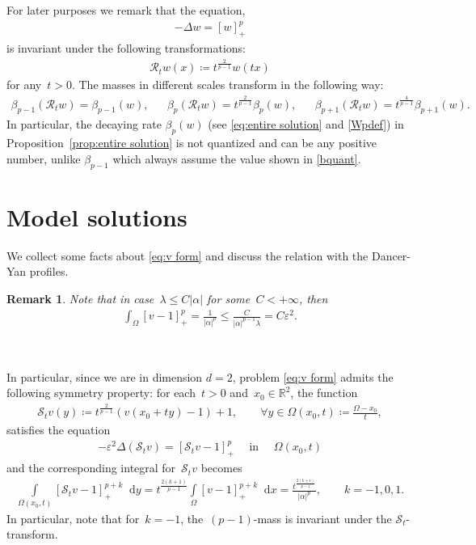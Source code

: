 \documentclass[10pt]{amsart}
\newcommand{\parenthesis}[1]{\left(#1\right)} %
\newcommand{\R}{\mathbb{R}}
\newcommand{\dd}{\mathop{}\!\mathrm{d}}
\def\R{\mathbb{R}}
\newtheorem{remark}[theorem]{Remark}
\begin{document}
For later purposes we remark that the equation,
    \begin{align}\label{rinv1}
        -\Delta  w= [w]_+^p
    \end{align}
    is invariant under the following transformations:
    \begin{align}\label{rinv2}
        {\mathcal{R}}_t w(x) \coloneq t^{\frac{2}{p-1}}w(tx)
    \end{align}
    for any~$t >0$.
    The masses in different scales transform in the following way:
    \begin{align}\label{rinv3}
       \beta_{p-1}({\mathcal{R}}_t w) =\beta_{p-1}(w), & &
        \beta_p ({\mathcal{R}}_t w) = t^{\frac{2}{p-1}} \beta_{p}(w), & &
        \beta_{p+1} ({\mathcal{R}}_t w) = t^{\frac{4}{p-1}} \beta_{p+1}(w).
    \end{align}
    In particular, the decaying rate $\beta_p(w)$ (see \eqref{eq:entire solution} and \eqref{Wpdef}) in Proposition~\ref{prop:entire solution} is
    not quantized and can be any positive number, unlike $\beta_{p-1}$ which always assume the value shown in \eqref{bquant}.

\bigskip


\section{Model solutions}\label{sec3}
We collect some facts about \eqref{eq:v form} and discuss the relation with the Dancer-Yan profiles.

\begin{remark}
    Note that in case~$\lambda\leq C|\alpha|$ for some~$C<+\infty$, then
    \begin{align*}
        \int_{\Omega} [v-1]_+^p=\frac{1}{|\alpha|^p}\leq \frac{C}{|\alpha|^{p-1}\lambda}=C\varepsilon^2.
    \end{align*}
\end{remark}

\

In particular, since we are in dimension $d=2$, problem \eqref{eq:v form} admits the following symmetry property: for each~$t>0$ and~$x_0\in\R^2$, the function
\begin{align*}
    \mathcal{S}_t v(y)\coloneqq t^{\frac{2}{p-1}} \parenthesis{ v(x_0+ ty) -1 }+1, \qquad \forall y\in \Omega(x_0,t)\coloneqq \frac{\Omega -x_0}{t},
\end{align*}
satisfies the equation
\begin{align*}
        -\varepsilon^2\Delta \parenthesis{\mathcal{S}_t v} = [\mathcal{S}_t v -1]_+^p \quad \mbox{ in }\quad  \Omega(x_0,t)
\end{align*}
and the corresponding integral for~$\mathcal{S}_t v$ becomes
\begin{align*}
    \int\limits_{\Omega(x_0,t)} [\mathcal{S}_t v -1]_+^{p+k} \dd y
    = t^{\frac{2(k+1)}{p-1}}\int\limits_{\Omega} [v-1]_+^{p+k} \dd x
    =\frac{t^{\frac{2(k+1)}{p-1}}}{|\alpha|^p}, \qquad k=-1,0,1.
\end{align*}
In particular, note that for~$k=-1$, the~$(p-1)$-mass is invariant under the $\mathcal{S}_t$-transform.
\end{document}
